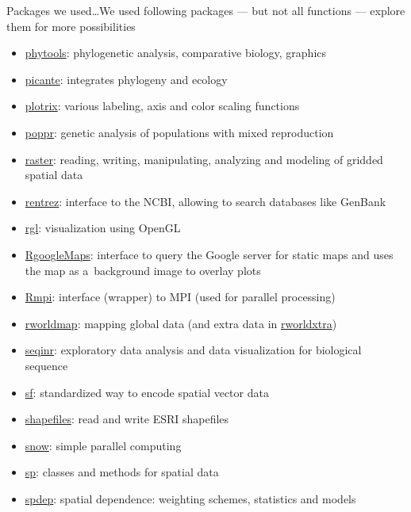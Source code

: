 \documentclass[compress, xelatex, 11pt, xcolor=svgnames, aspectratio=169,
	hyperref={
		bookmarks=true,
		unicode=true,
		colorlinks=true,
		pdftitle={Molecular data in R},
		plainpages=false,
		pdfauthor={Vojtech Zeisek},
		pdfsubject={Course about phylogeny and evolution in R},
		pdfcreator={XeLaTeX},
		pdfkeywords={R, evolution, phylogeny, molecular data},
		linkcolor=Crimson, %
		anchorcolor=Magenta, %
		citecolor=Magenta, %
		filecolor=Magenta, %
		menucolor=Magenta, %
		urlcolor=DodgerBlue, %
		},
	url={hyphens, lowtilde} %
	]{beamer}
\begin{document}
\begin{frame}[allowframebreaks]{Packages we used\ldots}{We used following packages --- but not all functions --- explore them for more possibilities}
\begin{itemize}
		\item \href{https://CRAN.R-project.org/package=phytools}{phytools}: phylogenetic analysis, comparative biology, graphics
		\item \href{https://CRAN.R-project.org/package=picante}{picante}: integrates phylogeny and ecology
		\item \href{https://CRAN.R-project.org/package=plotrix}{plotrix}: various labeling, axis and color scaling functions
		\item \href{https://CRAN.R-project.org/package=poppr}{poppr}: genetic analysis of populations with mixed reproduction
		\item \href{https://CRAN.R-project.org/package=raster}{raster}: reading, writing, manipulating, analyzing and modeling of gridded spatial data
		\item \href{https://CRAN.R-project.org/package=rentrez}{rentrez}: interface to the NCBI, allowing to search databases like GenBank
		\item \href{https://CRAN.R-project.org/package=rgl}{rgl}: visualization using OpenGL
		\item \href{https://CRAN.R-project.org/package=RgoogleMaps}{RgoogleMaps}: interface to query the Google server for static maps and uses the map as a~background image to overlay plots
		\item \href{https://CRAN.R-project.org/package=Rmpi}{Rmpi}: interface (wrapper) to MPI (used for parallel processing)
		\item \href{https://CRAN.R-project.org/package=rworldmap}{rworldmap}: mapping global data (and extra data in \href{https://CRAN.R-project.org/package=rworldxtra}{rworldxtra})
		\item \href{https://CRAN.R-project.org/package=seqinr}{seqinr}: exploratory data analysis and data visualization for biological sequence
		\item \href{https://CRAN.R-project.org/package=sf}{sf}: standardized way to encode spatial vector data
		\item \href{https://CRAN.R-project.org/package=shapefiles}{shapefiles}: read and write ESRI shapefiles
		\item \href{https://CRAN.R-project.org/package=snow}{snow}: simple parallel computing
		\item \href{https://CRAN.R-project.org/package=sp}{sp}: classes and methods for spatial data
		\item \href{https://CRAN.R-project.org/package=spdep}{spdep}: spatial dependence: weighting schemes, statistics and models

\end{itemize}
\end{frame}
\end{document}
